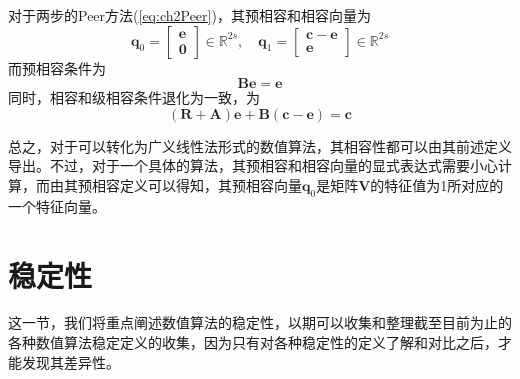 对于两步的Peer方法(\ref{eq:ch2Peer})，其预相容和相容向量为
\begin{equation}
\bm{q}_0=\begin{bmatrix}
\bm{e}\\ \bm{0}
\end{bmatrix}\in\mathbb{R}^{2s},\quad\bm{q}_1=\begin{bmatrix}
\bm{c}-\bm{e}\\ \bm{e}
\end{bmatrix}\in\mathbb{R}^{2s}
\end{equation}
而预相容条件为
\begin{equation}
\bm{Be}=\bm{e}
\end{equation}
同时，相容和级相容条件退化为一致，为
\begin{equation}
(\bm{R}+\bm{A})\bm{e}+\bm{B}(\bm{c}-\bm{e})=\bm{c}
\end{equation}

总之，对于可以转化为广义线性法形式的数值算法，其相容性都可以由其前述定义导出。不过，对于一个具体的算法，其预相容和相容向量的显式表达式需要小心计算，而由其预相容定义可以得知，其预相容向量$\bm{q}_0$是矩阵$\bm{V}$的特征值为1所对应的一个特征向量。
\section{稳定性}
这一节，我们将重点阐述数值算法的稳定性，以期可以收集和整理截至目前为止的各种数值算法稳定定义的收集，因为只有对各种稳定性的定义了解和对比之后，才能发现其差异性。


